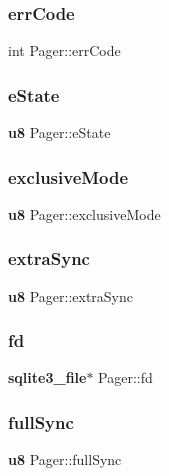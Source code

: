 \mbox{\label{struct_pager_addaf9648a1111d7b6c85166cf7c7a575}} 
\subsubsection{errCode}
{\footnotesize\ttfamily int Pager\+::err\+Code}

\mbox{\label{struct_pager_af03ee0ac77cf73453295ffcf43e46b43}} 
\subsubsection{eState}
{\footnotesize\ttfamily \textbf{ u8} Pager\+::e\+State}

\mbox{\label{struct_pager_a5cbccc156e07d6226cb65a7ab05ac116}} 
\subsubsection{exclusiveMode}
{\footnotesize\ttfamily \textbf{ u8} Pager\+::exclusive\+Mode}

\mbox{\label{struct_pager_a942f1ff74fbe690c2777d181c791589f}} 
\subsubsection{extraSync}
{\footnotesize\ttfamily \textbf{ u8} Pager\+::extra\+Sync}

\mbox{\label{struct_pager_a005ff1960fc1550a870cd1dae418c99e}} 
\subsubsection{fd}
{\footnotesize\ttfamily \textbf{ sqlite3\+\_\+file}$\ast$ Pager\+::fd}

\mbox{\label{struct_pager_abae5c9c3d85120ae266acc4c9a355b86}} 
\subsubsection{fullSync}
{\footnotesize\ttfamily \textbf{ u8} Pager\+::full\+Sync}

\mbox{\label{struct_pager_a8d4961bd8449f4bf8157763bb7e56b4f}} 
